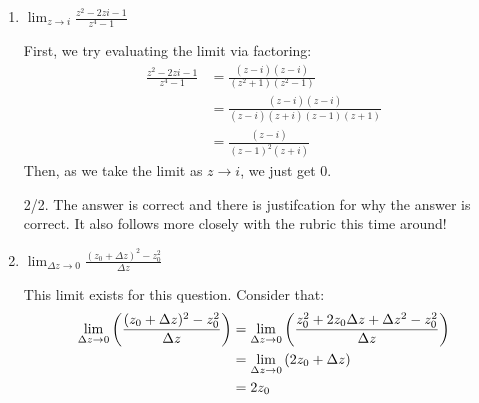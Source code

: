 \begin{enumerate}
\begin{enumerate}
	\item $\lim_{z\to i} \frac{z^2-2zi -1}{z^4-1}$
	\begin{problem}
		First, we try evaluating the limit via factoring:
		\begin{align*}
			\frac{z^2-2zi -1}{z^4-1} &= \frac{(z-i)(z-i)}{(z^2+1)(z^2-1)}\\
			&= \frac{(z-i)(z-i)}{(z-i)(z+i)(z-1)(z+1)}\\
			&=\frac{(z-i)}{(z-1)^2(z+i)}
		\end{align*}
		Then, as we take the limit as $z\to i$, we just get 0. 
	\end{problem}
	\begin{grade}
		2/2. The answer is correct and there is justifcation for why the answer is correct. It also follows more closely with the rubric this time around!
	\end{grade}
	\item $\lim_{\Delta z \to 0} \frac{(z_0 + \Delta z)^2 -z_0^2}{\Delta z}$
	\begin{problem}
		This limit exists for this question. Consider that:
		\begin{align*}
			\lim_{\Delta z\to0}\left(\frac{(z_0+\Delta z)^2 - z_0^2}{\Delta z}\right)&=\lim_{\Delta z\to0}\left(\frac{z_0^2 + 2z_0\Delta z + \Delta z^2 - z_0^2}{\Delta z}\right)\\
			&= \lim_{\Delta z\to0}\left(2z_0 + \Delta z\right)\\
			&= 2z_0
		\end{align*}
	\end{problem}
	\end{enumerate}


\end{enumerate}
